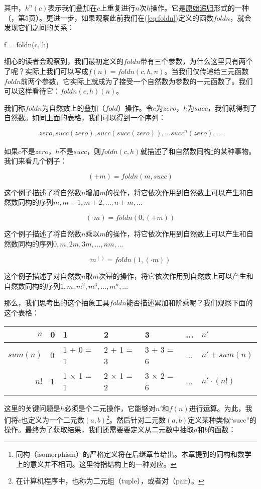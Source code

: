 \documentclass[UTF8]{article}
\begin{document}
其中，$h^n(c)$表示我们叠加在$c$上重复进行$n$次$h$操作。它是\underline{原始递归}形式的一种（\cite{Bird97}，第5页）。更进一步，如果观察此前我们在(\ref{eq:foldn})定义的函数$foldn$，就会发现它们之间的关系：

\be
f = foldn(c, h)
\ee

细心的读者会观察到，我们最初定义的$foldn$带有三个参数，为什么这里只有两个了呢？实际上我们可以写成$f(n) = foldn(c, h, n)$。当我们仅传递给三元函数$foldn$前两个参数，它实际上就成为了接受一个自然数为参数的一元函数了。我们可以这样看待它：$foldn(c, h)(n)$。

我们称$foldn$为自然数上的叠加（$fold$）操作。令$c$为$zero$，$h$为$succ$，我们就得到了自然数。如同上面的表格，我们可以得到一个序列：

\[
zero, succ(zero), succ(succ(zero)), ... succ^n(zero), ...
\]

如果$c$不是$zero$，$h$不是$succ$，则$foldn(c, h)$就描述了和自然数同构\footnote{同构（isomorphism）的严格定义将在后继章节给出。本章提到的同构和数学上的意义并不相同。这里特指结构上的一种对应。}的某种事物。我们来看几个例子：

\[
(+ m) = foldn(m, succ)
\]

这个例子描述了将自然数$n$增加$m$的操作，将它依次作用到自然数上可以产生和自然数同构的序列$m, m + 1, m + 2, ..., n + m, ...$

\[
(\cdot m) = foldn(0, (+ m))
\]

这个例子描述了将自然数$n$乘以$m$的操作，将它依次作用到自然数上可以产生和自然数同构的序列$0, m, 2m, 3m, ..., nm, ...$

\[
m^{()} = foldn(1, (\cdot m))
\]

这个例子描述了对自然数$n$取$m$次幂的操作，将它依次作用到自然数上可以产生和自然数同构的序列$1, m, m^2, m^3, ..., m^n, ...$

那么，我们思考出的这个抽象工具$foldn$能否描述累加和阶乘呢？我们观察下面的这个表格：

\begin{tabular}{r|l|l|l|l|l|l}
$n$ & 0 & 1 & 2 & 3 & ... & $n'$ \\
\hline
$sum(n)$ & 0 & 1 + 0 = 1 & 2 + 1 = 3 & 3 + 3 = 6 & ... & $n' + sum(n)$ \\
\hline
$n!$ & 1 & 1 $\times$ 1 = 1 & 2 $\times$ 1 = 2 & 3 $\times$ 2 = 6 & ... & $n' \cdot (n!)$
\end{tabular}

这里的关键问题是$h$必须是个二元操作，它能够对$n'$和$f(n)$进行运算。为此，我们将$c$也定义为一个二元数$(a, b)$\footnote{在计算机程序中，也称为二元组（tuple），或者对（pair）。}。然后针对二元数$(a, b)$定义某种类似“succ”的操作。最终为了获取结果，我们还需要要定义从二元数中抽取$a$和$b$的函数：
\end{document}

